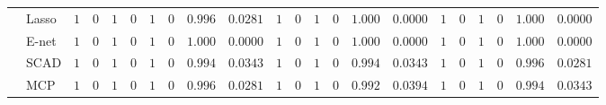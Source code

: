 \begin{tabular}{p{0.2cm}p{1cm}|p{0.6cm}p{0.6cm}|p{0.6cm}p{0.6cm}p{0.6cm}p{0.6cm}p{0.6cm}p{0.6cm}|p{0.6cm}p{0.6cm}p{0.6cm}p{0.6cm}p{0.6cm}p{0.6cm}|p{0.6cm}p{0.6cm}p{0.6cm}p{0.6cm}p{0.6cm}p{0.6cm}}
 & Lasso  & $1$ & $0$ & $1$ & $0$ & $1$ & $0$ & $0.996$ & $0.0281$ & $1$ & $0$ & $1$ & $0$ & $1.000$ & $0.0000$ & $1$ & $0$ & $1$ & $0$ & $1.000$ & $0.0000$ \\
 & E-net  & $1$ & $0$ & $1$ & $0$ & $1$ & $0$ & $1.000$ & $0.0000$ & $1$ & $0$ & $1$ & $0$ & $1.000$ & $0.0000$ & $1$ & $0$ & $1$ & $0$ & $1.000$ & $0.0000$ \\
 & SCAD  & $1$ & $0$ & $1$ & $0$ & $1$ & $0$ & $0.994$ & $0.0343$ & $1$ & $0$ & $1$ & $0$ & $0.994$ & $0.0343$ & $1$ & $0$ & $1$ & $0$ & $0.996$ & $0.0281$ \\
 & MCP  & $1$ & $0$ & $1$ & $0$ & $1$ & $0$ & $0.996$ & $0.0281$ & $1$ & $0$ & $1$ & $0$ & $0.992$ & $0.0394$ & $1$ & $0$ & $1$ & $0$ & $0.994$ & $0.0343$ \\
\hline 
\end{tabular}

